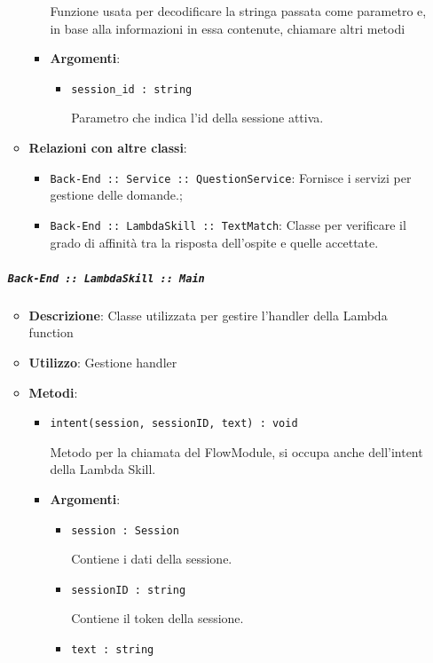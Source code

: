 \documentclass[../DefinizioneDiProdotto.tex]{subfiles}
\begin{document}
\begin{itemize}
\begin{itemize}
\begin{itemize}
	 Funzione usata per decodificare la stringa passata come parametro e, in base alla informazioni in essa contenute, chiamare altri metodi

	\item \textbf{Argomenti}:
	\begin{itemize}
	\item \texttt{session\_id : string}\

	 Parametro che indica l'id della sessione attiva.
	\end{itemize}
	\end{itemize}\vspace{0.5em}
	\item \textbf{Relazioni con altre classi}:
	\begin{itemize}
	\item \texttt{Back-End :: Service :: QuestionService}: Fornisce i servizi per gestione delle domande.;
	\item \texttt{Back-End :: LambdaSkill :: TextMatch}: Classe per verificare il grado di affinità tra la risposta dell'ospite e quelle accettate.
	\end{itemize}
	\end{itemize}\subparagraph{\texttt{Back-End :: LambdaSkill :: Main}}
	\begin{itemize}\item \textbf{Descrizione}: Classe utilizzata per gestire l'handler della Lambda function
	\item \textbf{Utilizzo}: Gestione handler
	\item \textbf{Metodi}:
	\begin{itemize}
	\item \texttt{intent(session, sessionID, text) : void}\

	 Metodo per la chiamata del FlowModule, si occupa anche dell'intent della Lambda Skill.

	\item \textbf{Argomenti}:
	\begin{itemize}
	\item \texttt{session : Session}\

	 Contiene i dati della sessione.
	\item \texttt{sessionID : string}\

	 Contiene il token della sessione.
	\item \texttt{text : string}\


\end{itemize}
\end{itemize}
\end{itemize}
\end{itemize}
\end{document}
